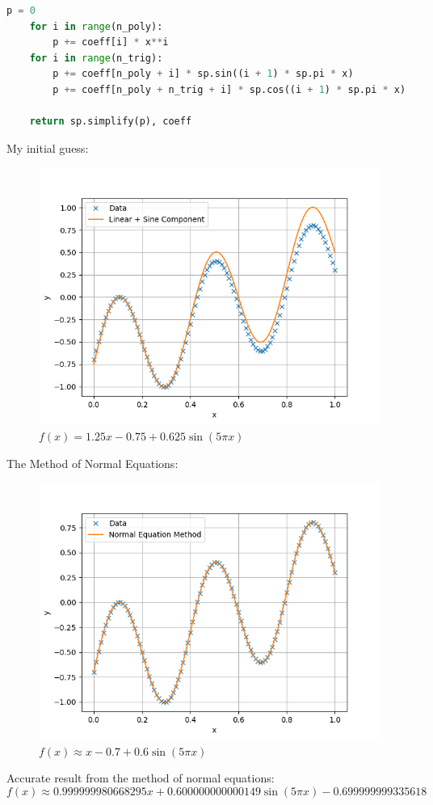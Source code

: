 \documentclass[conference,onecolumn]{IEEEtran}
\begin{document}
\begin{enumerate}[label=\arabic{enumi}.]
\begin{lstlisting}[language=Python]
    p = 0
    for i in range(n_poly):
        p += coeff[i] * x**i
    for i in range(n_trig):
        p += coeff[n_poly + i] * sp.sin((i + 1) * sp.pi * x)
        p += coeff[n_poly + n_trig + i] * sp.cos((i + 1) * sp.pi * x)

    return sp.simplify(p), coeff
            \end{lstlisting}

            My initial guess:
            \begin{figure}[H]
                  \centering
                  \includegraphics[width = .6\linewidth]{figs/Q2_guess.png}
                  \caption{$f(x) = 1.25 x - 0.75 + 0.625 \sin(5\pi x)$}
            \end{figure}
            The Method of Normal Equations:
            \begin{figure}[H]
                  \centering
                  \includegraphics[width = .6\linewidth]{figs/Q2_fit.png}
                  \caption{$f(x) \approx x - 0.7 + 0.6 \sin(5\pi x)$}
            \end{figure}

            Accurate result from the method of normal equations:
            $$
                  f(x) \approx 0.999999980668295 x + 0.600000000000149 \sin(5\pi x) - 0.699999999335618
            $$


\end{enumerate}
\end{document}
